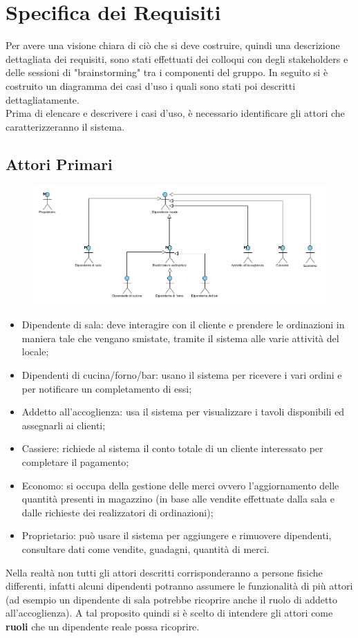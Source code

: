 \chapter{Specifica dei Requisiti}
Per avere una visione chiara di ciò che si deve costruire, quindi una descrizione dettagliata dei requisiti, sono stati effettuati dei colloqui con degli stakeholders e delle sessioni di "brainstorming" tra i componenti del gruppo. In seguito si è costruito un diagramma dei casi d'uso i quali sono stati poi descritti dettagliatamente.
\\Prima di elencare e descrivere i casi d'uso, è necessario identificare gli attori che caratterizzeranno il sistema.

\section{Attori Primari}
\begin{figure}[H]
	\centering
	\includegraphics[width=\textwidth]{Immagini/AttoriPrimari.png}
\end{figure}

\begin{itemize}
	\item Dipendente di sala: deve interagire con il cliente e prendere le ordinazioni in maniera tale che vengano smistate, tramite il sistema alle varie attività del locale;
	\item Dipendenti di cucina/forno/bar: usano il sistema per ricevere i vari ordini e per notificare un completamento di essi;
	\item Addetto all'accoglienza: usa il sistema per visualizzare i tavoli disponibili ed assegnarli ai clienti;
	\item Cassiere: richiede al sistema il conto totale di un cliente interessato per completare il pagamento;
	\item Economo: si occupa della gestione delle merci ovvero l'aggiornamento delle quantità presenti in magazzino (in base alle vendite effettuate dalla sala e dalle richieste dei realizzatori di ordinazioni);
	\item Proprietario: può usare il sistema per aggiungere e rimuovere dipendenti, consultare dati come vendite, guadagni, quantità di merci.
\end{itemize}
Nella realtà non tutti gli attori descritti corrisponderanno a persone fisiche differenti, infatti alcuni dipendenti potranno assumere le funzionalità di più attori (ad esempio un dipendente di sala potrebbe ricoprire anche il ruolo di addetto all'accoglienza). A tal proposito quindi si è scelto di intendere gli attori come \textbf{ruoli} che un dipendente reale possa ricoprire.

